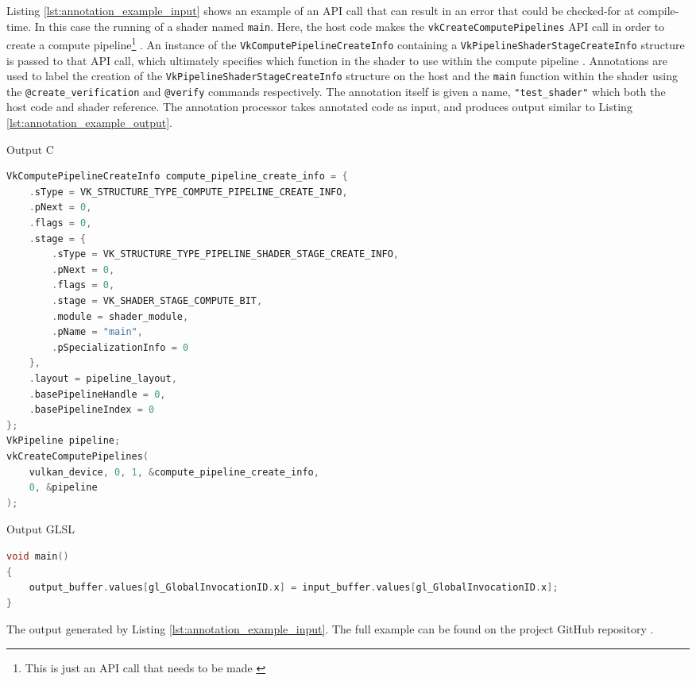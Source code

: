 \documentclass[a4paper,12pt,twoside,openright]{report}
\begin{document}
Listing \ref{lst:annotation_example_input} shows an example of an API call that
can result in an error that could be checked-for at compile-time. In this case
the running of a shader named \texttt{main}. Here, the host code makes the
\texttt{vkCreateComputePipelines} API call in order to create a compute
pipeline\footnote{This is just an API call that needs to be made \cite{TODO}}
\cite{vkCreateComputePipelines}. An instance of the
\texttt{VkComputePipelineCreateInfo} containing a
\texttt{VkPipelineShaderStageCreateInfo} structure is passed to that API call,
which ultimately specifies which function in the shader to use within the
compute pipeline \cite{VkComputePipelineCreateInfo}
\cite{VkPipelineShaderStageCreateInfo}. Annotations are used to label the
creation of the \texttt{VkPipelineShaderStageCreateInfo} structure on the host
and the \texttt{main} function within the shader using the
\texttt{@create\_verification} and \texttt{@verify} commands respectively. The
annotation itself is given a name, \texttt{"test\_shader"} which both the host
code and shader reference. The annotation processor takes annotated code as
input, and produces output similar to Listing
\ref{lst:annotation_example_output}.

\begin{lstfloat}
\begin{center} Output C \end{center}
\begin{lstlisting}[language=C]
VkComputePipelineCreateInfo compute_pipeline_create_info = {
    .sType = VK_STRUCTURE_TYPE_COMPUTE_PIPELINE_CREATE_INFO,
    .pNext = 0,
    .flags = 0,
    .stage = {
        .sType = VK_STRUCTURE_TYPE_PIPELINE_SHADER_STAGE_CREATE_INFO,
        .pNext = 0,
        .flags = 0,
        .stage = VK_SHADER_STAGE_COMPUTE_BIT,
        .module = shader_module,
        .pName = "main",
        .pSpecializationInfo = 0
    },
    .layout = pipeline_layout,
    .basePipelineHandle = 0,
    .basePipelineIndex = 0
};
VkPipeline pipeline;
vkCreateComputePipelines(
    vulkan_device, 0, 1, &compute_pipeline_create_info,
    0, &pipeline
);
\end{lstlisting}
\begin{center} Output GLSL \end{center}
\begin{lstlisting}[language=C]
void main()
{
    output_buffer.values[gl_GlobalInvocationID.x] = input_buffer.values[gl_GlobalInvocationID.x];
}
\end{lstlisting}
\caption{The output generated by Listing \ref{lst:annotation_example_input}. The full
example can be found on the project GitHub repository \cite{ProjectSource}.}
\label{lst:annotation_example_output}
\end{lstfloat}
\end{document}
